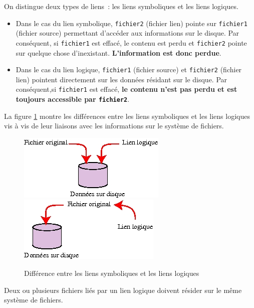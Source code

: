 On distingue deux types de liens~: les liens symboliques et les liens logiques.

\begin{itemize}
	\item	{}Dans le cas du lien symbolique, {\tt fichier2} (fichier lien)
			pointe sur {\tt fichier1} (fichier source) permettant d'acc{\'e}der
			aux informations sur le disque. Par cons{\'e}quent, si {\tt fichier1}
			est effac{\'e}, le contenu est perdu et {\tt fichier2} pointe
			sur quelque chose d'inexistant. {\bf L'information est donc perdue}.\\
	\item	{}Dans le cas du lien logique, {\tt fichier1} (fichier source) et
			{\tt fichier2} (fichier lien) pointent directement sur les donn{\'e}es
			r{\'e}sidant sur le disque. Par cons{\'e}quent,si {\tt fichier1} est effac{\'e},
			{\bf le contenu n'est pas perdu et est toujours accessible par
			{\tt fichier2}}.
\end{itemize}

La figure \ref{fig-cmds-links} montre les diff{\'e}rences entre les liens symboliques
et les liens logiques vis {\`a} vis de leur liaisons avec les informations sur
le syst{\`e}me de fichiers.

\begin{figure}[hbtp]
\centering
\includegraphics{./_Images/cmds-unix/log-links.jpg}
\includegraphics{./_Images/cmds-unix/symb-links.jpg}
\caption{\label{fig-cmds-links}Diff{\'e}rence entre les liens symboliques et les
liens logiques}
\end{figure}

\begin{remarque}
Deux ou plusieurs fichiers li{\'e}s par un lien logique doivent r{\'e}sider
sur le m{\^e}me syst{\`e}me de fichiers.
\end{remarque}


